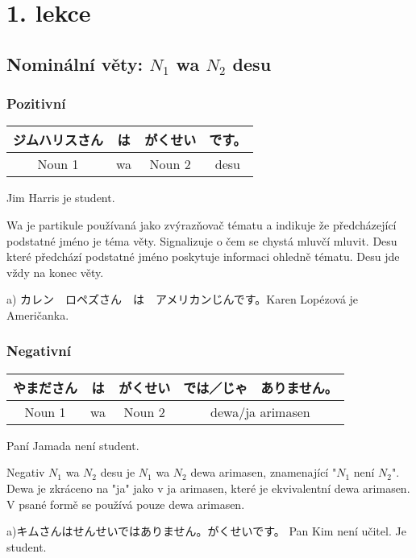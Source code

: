 \section{1. lekce}
\label{sec:lekce_1}

\subsection{Nominální věty: $N_1$ wa $N_2$ desu}

\subsubsection{Pozitivní}

\begin{center}
\begin{tabular}{||c|c||c|c||}
\hline
ジムハリスさん&は&がくせい&です。\\
\hline
Noun 1&wa&Noun 2&desu\\
\hline
\end{tabular}
\end{center}
Jim Harris je student.

Wa je partikule používaná jako zvýrazňovač tématu a indikuje že předcházející podstatné jméno je téma věty. Signalizuje o čem se chystá mluvčí mluvit. Desu které předchází podstatné jméno poskytuje informaci ohledně tématu. Desu jde vždy na konec věty.

a) カレン　ロペズさん　は　アメリカンじんです。Karen Lopézová je Američanka.

\subsubsection{Negativní}
\begin{center}
\begin{tabular}{||c|c||c|c||}
\hline
やまださん&は&がくせい&では／じゃ　ありません。\\
\hline
Noun 1&wa&Noun 2&dewa/ja arimasen\\
\hline
\end{tabular}
\end{center}
Paní Jamada není student.

Negativ  $N_1$ wa $N_2$ desu je $N_1$ wa $N_2$ dewa arimasen, znamenající "$N_1$ není $N_2$". Dewa je zkráceno na "ja" jako v ja arimasen, které je ekvivalentní dewa arimasen. V psané formě se používá pouze dewa arimasen.


a)キムさんはせんせいではありません。がくせいです。 Pan Kim není učitel. Je student.




